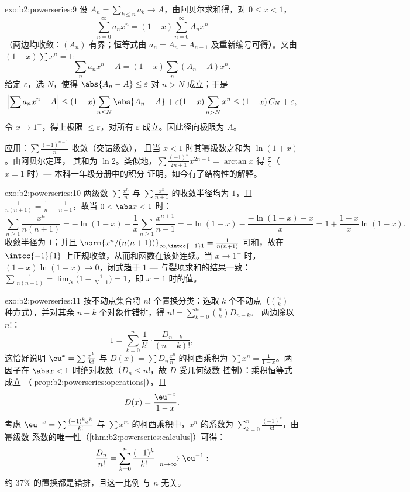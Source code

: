 \begin{solution}{exo:b2:powerseries:9}
设 $A_n = \sum_{k \leq n} a_k \to A$，由阿贝尔求和得，对
$0 \leq x < 1$，
\[
\sum_{n=0}^{\infty} a_n x^n = (1 - x)\sum_{n=0}^{\infty} A_n x^n
\]
（两边均收敛：$(A_n)$ 有界；恒等式由
$a_n = A_n - A_{n-1}$ 及重新编号可得）。又由 $(1 -
x)\sum x^n = 1$:
\[
\sum_n a_nx^n - A = (1-x)\sum_{n} (A_n - A)x^n .
\]
给定 $\varepsilon$，选 $N$，使得 $\abs{A_n - A} \leq
\varepsilon$ 对 $n > N$ 成立；于是
\[
\Bigl|\sum a_nx^n - A\Bigr|
\leq (1-x)\sum_{n \leq N}\abs{A_n - A} + \varepsilon(1 -
x)\sum_{n > N}x^n
\leq (1-x)\,C_N + \varepsilon ,
\]
令 $x \to 1^-$，得上极限 $\leq \varepsilon$，对所有
$\varepsilon$ 成立。因此径向极限为 $A$。

应用：$\sum \frac{(-1)^{n-1}}{n}$ 收敛（交错级数），
且当 $x < 1$ 时其幂级数之和为 $\ln(1 + x)$。由阿贝尔定理，
其和为 $\ln 2$。类似地，$\sum\frac{(-1)^n}{2n+1}x^{2n+1} =
\arctan x$ 得 $\frac\pi4$（$x = 1$ 时）--- 本科一年级分册中的积分
证明，如今有了结构性的解释。
\end{solution}

\begin{solution}{exo:b2:powerseries:10}
两级数 $\sum\frac{x^n}{n}$ 与 $\sum\frac{x^n}{n+1}$ 的收敛半径均为
$1$，且 $\frac{1}{n(n+1)} = \frac1n - \frac1{n+1}$，故当 $0
< \abs x < 1$ 时：
\[
\sum_{n\geq1}\frac{x^n}{n(n+1)}
= -\ln(1-x) - \frac1x\sum_{n\geq1}\frac{x^{n+1}}{n+1}
= -\ln(1-x) - \frac{-\ln(1-x) - x}{x}
= 1 + \frac{1-x}{x}\ln(1-x) .
\]
收敛半径为 $1$；并且 $\norm{x^n/(n(n+1))}_{\infty,\intcc{-1}1} =
\frac{1}{n(n+1)}$ 可和，故在
$\intcc{-1}{1}$ 上正规收敛，从而和函数在该处连续。当 $x \to
1^-$ 时，$(1-x)\ln(1-x) \to 0$，闭式趋于 $1$ ---
与裂项求和的结果一致：$\sum\frac{1}{n(n+1)} =
\lim_N\bigl(1 - \frac{1}{N+1}\bigr) = 1$，即 $x = 1$ 时的值。
\end{solution}

\begin{solution}{exo:b2:powerseries:11}
按不动点集合将 $n!$ 个置换分类：选取
$k$ 个不动点（$\binom nk$ 种方式），并对其余
$n - k$ 个对象作错排，得 $n! = \sum_{k=0}^n\binom nk D_{n-k}$。
两边除以 $n!$：
\[
1 = \sum_{k=0}^{n}\frac{1}{k!}\cdot\frac{D_{n-k}}{(n-k)!} ,
\]
这恰好说明 $\eu^x =
\sum\frac{x^k}{k!}$ 与 $D(x) = \sum D_n\frac{x^n}{n!}$ 的柯西乘积为
$\sum x^n = \frac{1}{1-x}$。两因子在
$\abs x < 1$ 时绝对收敛（$D_n \leq n!$，故 $D$ 受几何级数
控制）：乘积恒等式成立
（\cref{prop:b2:powerseries:operations}），且
\[
D(x) = \frac{\eu^{-x}}{1-x} .
\]
考虑 $\eu^{-x} = \sum\frac{(-1)^kx^k}{k!}$ 与
$\sum x^m$ 的柯西乘积中，$x^n$ 的系数为
$\sum_{k=0}^{n}\frac{(-1)^k}{k!}$，由幂级数
系数的唯一性（\cref{thm:b2:powerseries:calculus}）可得：
\[
\frac{D_n}{n!} = \sum_{k=0}^{n}\frac{(-1)^k}{k!}
\xrightarrow[n\to\infty]{} \eu^{-1} :
\]
约 $37\%$ 的置换都是错排，且这一比例
与 $n$ 无关。
\end{solution}

